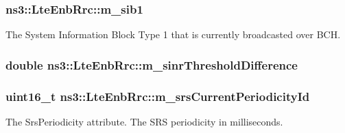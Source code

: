 \subsubsection[{\texorpdfstring{m\+\_\+sib1}{m_sib1}}]{ ns3\+::\+Lte\+Enb\+Rrc\+::m\+\_\+sib1\hspace{0.3cm}{\ttfamily [private]}}\hypertarget{classns3_1_1LteEnbRrc_afce975031adff5a9b596d62cfc1ab633}{}\label{classns3_1_1LteEnbRrc_afce975031adff5a9b596d62cfc1ab633}


The System Information Block Type 1 that is currently broadcasted over B\+CH. 

\subsubsection[{\texorpdfstring{m\+\_\+sinr\+Threshold\+Difference}{m_sinrThresholdDifference}}]{ double ns3\+::\+Lte\+Enb\+Rrc\+::m\+\_\+sinr\+Threshold\+Difference\hspace{0.3cm}{\ttfamily [private]}}\hypertarget{classns3_1_1LteEnbRrc_aef56a65c644f6ed3c5f28a540ded624f}{}\label{classns3_1_1LteEnbRrc_aef56a65c644f6ed3c5f28a540ded624f}
\subsubsection[{\texorpdfstring{m\+\_\+srs\+Current\+Periodicity\+Id}{m_srsCurrentPeriodicityId}}]{\setlength{\rightskip}{0pt plus 5cm}uint16\+\_\+t ns3\+::\+Lte\+Enb\+Rrc\+::m\+\_\+srs\+Current\+Periodicity\+Id\hspace{0.3cm}{\ttfamily [private]}}\hypertarget{classns3_1_1LteEnbRrc_abf0c77f8f27fff5a4e00608a6c822a8b}{}\label{classns3_1_1LteEnbRrc_abf0c77f8f27fff5a4e00608a6c822a8b}
The {\ttfamily Srs\+Periodicity} attribute. The S\+RS periodicity in milliseconds. 
